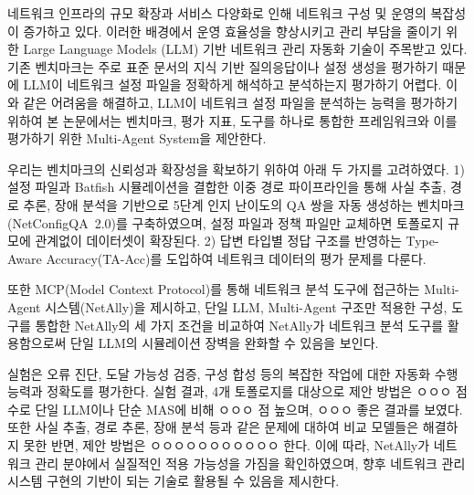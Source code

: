 
네트워크 인프라의 규모 확장과 서비스 다양화로 인해 네트워크 구성 및 운영의 복잡성이 증가하고 있다. 이러한 배경에서 운영 효율성을 향상시키고 관리 부담을 줄이기 위한 Large Language Models (LLM) 기반 네트워크 관리 자동화 기술이 주목받고 있다.
기존 벤치마크는 주로 표준 문서의 지식 기반 질의응답이나 설정 생성을 평가하기 때문에 LLM이 네트워크 설정 파일을 정확하게 해석하고 분석하는지 평가하기 어렵다.
이와 같은 어려움을 해결하고, LLM이 네트워크 설정 파일을 분석하는 능력을 평가하기 위하여 본 논문에서는 벤치마크, 평가 지표, 도구를 하나로 통합한 프레임워크와 이를 평가하기 위한 Multi-Agent System을 제안한다.

우리는 벤치마크의 신뢰성과 확장성을 확보하기 위하여 아래 두 가지를 고려하였다.
1) 설정 파일과 Batfish 시뮬레이션을 결합한 이중 경로 파이프라인을 통해 사실 추출, 경로 추론, 장애 분석을 기반으로 5단계 인지 난이도의 QA 쌍을 자동 생성하는 벤치마크(NetConfigQA~2.0)를 구축하였으며, 설정 파일과 정책 파일만 교체하면 토폴로지 규모에 관계없이 데이터셋이 확장된다.
2) 답변 타입별 정답 구조를 반영하는 Type-Aware Accuracy(TA-Acc)를 도입하여 네트워크 데이터의 평가 문제를 다룬다.

또한 MCP(Model Context Protocol)를 통해 네트워크 분석 도구에 접근하는 Multi-Agent 시스템(NetAlly)을 제시하고, 단일 LLM, Multi-Agent 구조만 적용한 구성, 도구를 통합한 NetAlly의 세 가지 조건을 비교하여 NetAlly가 네트워크 분석 도구를 활용함으로써 단일 LLM의 시뮬레이션 장벽을 완화할 수 있음을 보인다.

실험은 오류 진단, 도달 가능성 검증, 구성 합성 등의 복잡한 작업에 대한 자동화 수행 능력과 정확도를 평가한다.
실험 결과, 4개 토폴로지를 대상으로 제안 방법은 ㅇㅇㅇ 점수로 단일 LLM이나 단순 MAS에 비해 ㅇㅇㅇ 점 높으며, ㅇㅇㅇ 좋은 결과를 보였다.
또한 사실 추출, 경로 추론, 장애 분석 등과 같은 문제에 대하여 비교 모델들은 해결하지 못한 반면, 제안 방법은 ㅇㅇㅇㅇㅇㅇㅇㅇㅇㅇㅇ 한다.
이에 따라, NetAlly가 네트워크 관리 분야에서 실질적인 적용 가능성을 가짐을 확인하였으며, 향후 네트워크 관리 시스템 구현의 기반이 되는 기술로 활용될 수 있음을 제시한다.

